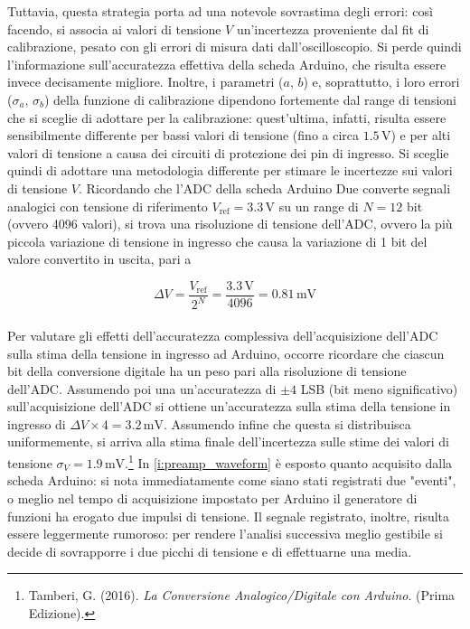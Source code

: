 \documentclass[a4paper,11pt]{article} %
\begin{document}
Tuttavia, questa strategia porta ad una notevole sovrastima degli errori: così facendo, si associa ai valori di tensione
$V$ un'incertezza proveniente dal fit di calibrazione, pesato con gli errori di misura dati dall'oscilloscopio. Si perde
quindi l'informazione sull'accuratezza effettiva della scheda Arduino, che risulta essere invece decisamente migliore.
Inoltre, i parametri ($a$, $b$) e, soprattutto, i loro errori ($\sigma_a$, $\sigma_b$) della funzione di calibrazione
dipendono fortemente dal range di tensioni che si sceglie di adottare per la calibrazione: quest'ultima, infatti,
risulta essere sensibilmente differente per bassi valori di tensione (fino a circa $1.5\,\si{\volt}$) e per alti valori
di tensione a causa dei circuiti di protezione dei pin di ingresso. Si sceglie quindi di adottare una metodologia
differente per stimare le incertezze sui valori di tensione $V$. Ricordando che l'ADC della scheda Arduino Due converte
segnali analogici con tensione di riferimento $V_{\text{ref}}=3.3\,\si{\volt}$ su un range di $N = 12$ bit (ovvero 4096
valori), si trova una risoluzione di tensione dell’ADC, ovvero la più piccola variazione di tensione in ingresso che
causa la variazione di 1 bit del valore convertito in uscita, pari a 

\begin{equation}
	\Delta V = \frac{V_{\text{ref}}}{2^N} = \frac{3.3\,\si{\volt}}{4096} = 0.81 \,\si{\milli\volt}
\end{equation}\\
Per valutare gli effetti dell'accuratezza complessiva dell’acquisizione dell’ADC sulla stima della tensione in ingresso
ad Arduino, occorre ricordare che ciascun bit della conversione digitale ha un peso pari alla risoluzione di tensione
dell’ADC. Assumendo poi una un'accuratezza di $\pm 4$ LSB (bit meno significativo) sull’acquisizione dell’ADC si ottiene
un'accuratezza sulla stima della tensione in ingresso di $\Delta V \times 4 = 3.2 \,\si{\milli\volt}$. Assumendo infine
che questa si distribuisca uniformemente, si arriva alla stima finale dell'incertezza sulle stime dei valori di tensione
$\sigma_{V} = 1.9 \,\si{\milli\volt}$.\footnote{Tamberi, G. (2016). \textit{La Conversione Analogico/Digitale con
Arduino}. (Prima Edizione).} In \autoref{i:preamp_waveform} è esposto quanto acquisito dalla scheda Arduino: si nota
immediatamente come siano stati registrati due "eventi", o meglio nel tempo di acquisizione impostato per Arduino il
generatore di funzioni ha erogato due impulsi di tensione. Il segnale registrato, inoltre, risulta essere leggermente
rumoroso: per rendere l'analisi successiva meglio gestibile si decide di sovrapporre i due picchi di tensione e di
effettuarne una media. 
\end{document}
